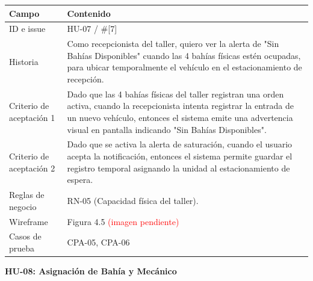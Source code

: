 {\def\LTcaptype{none} %
\begin{longtable}[]{@{}
  >{\raggedright\arraybackslash}p{}
  >{\raggedright\arraybackslash}p{}@{}}
\toprule\noalign{}
\begin{minipage}[b]{\linewidth}\raggedright
\textbf{Campo}
\end{minipage} & \begin{minipage}[b]{\linewidth}\raggedright
\textbf{Contenido}
\end{minipage} \\
\midrule\noalign{}
\endhead
\bottomrule\noalign{}
\endlastfoot
ID e issue & HU-07 / \#{[}7{]} \\
Historia & Como recepcionista del taller, quiero ver la alerta de "Sin
Bahías Disponibles" cuando las 4 bahías físicas estén ocupadas, para
ubicar temporalmente el vehículo en el estacionamiento de recepción. \\
Criterio de aceptación 1 & Dado que las 4 bahías físicas del taller
registran una orden activa, cuando la recepcionista intenta registrar la
entrada de un nuevo vehículo, entonces el sistema emite una advertencia
visual en pantalla indicando "Sin Bahías Disponibles". \\
Criterio de aceptación 2 & Dado que se activa la alerta de saturación,
cuando el usuario acepta la notificación, entonces el sistema permite
guardar el registro temporal asignando la unidad al estacionamiento de
espera. \\
Reglas de negocio & RN-05 (Capacidad física del taller). \\
Wireframe & Figura 4.5 \textcolor{red}{(imagen pendiente)} \\
Casos de prueba & CPA-05, CPA-06 \\
\end{longtable}
}

\textbf{HU-08: Asignación de Bahía y Mecánico}

